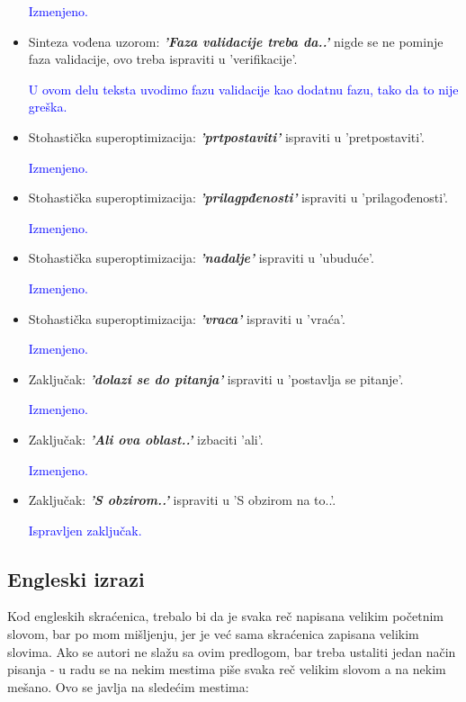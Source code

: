 \documentclass[a4paper]{report}
\newcommand{\odgovor}[1]{\textcolor{blue}{#1}}
\begin{document}
\begin{itemize}
	\odgovor{Izmenjeno.}

    \item Sinteza vođena uzorom: \textbf{\textit{'Faza validacije treba da..'}} nigde se ne pominje faza validacije, ovo treba ispraviti u 'verifikacije'.

	\odgovor{U ovom delu teksta uvodimo fazu validacije kao dodatnu fazu, tako da to nije greška.}

    \item Stohastička superoptimizacija: \textbf{\textit{'prtpostaviti'}} ispraviti u 'pretpostaviti'.

	\odgovor{Izmenjeno.}

    \item Stohastička superoptimizacija: \textbf{\textit{'prilagpđenosti'}} ispraviti u 'prilagođenosti'.

	\odgovor{Izmenjeno.}

    \item Stohastička superoptimizacija: \textbf{\textit{'nadalje'}} ispraviti u 'ubuduće'.

	\odgovor{Izmenjeno.}

    \item Stohastička superoptimizacija: \textbf{\textit{'vraca'}} ispraviti u 'vraća'.

	\odgovor{Izmenjeno.}

    \item Zaključak: \textbf{\textit{'dolazi se do pitanja'}} ispraviti u 'postavlja se pitanje'.

	\odgovor{Izmenjeno.}

    \item Zaključak: \textbf{\textit{'Ali ova oblast..'}} izbaciti 'ali'.

	\odgovor{Izmenjeno.}

    \item Zaključak: \textbf{\textit{'S obzirom..'}} ispraviti u 'S obzirom na to..'.

    \odgovor {Ispravljen zaključak.}
\end{itemize}


\subsection{Engleski izrazi}
Kod engleskih skraćenica, trebalo bi da je svaka reč napisana velikim početnim slovom, bar po mom mišljenju, jer je već sama skraćenica zapisana velikim slovima. Ako se autori ne slažu sa ovim predlogom, bar treba ustaliti jedan način pisanja - u radu se na nekim mestima piše svaka reč velikim slovom a na nekim mešano. Ovo se javlja na sledećim mestima:
\end{document}
